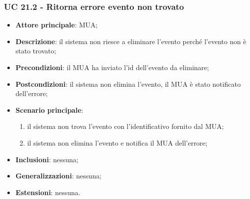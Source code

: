     \subsubsection{UC 21.2 - Ritorna errore evento non trovato} \label{sec:UC21.2}
    \begin{itemize}
        \item \textbf{Attore principale}: MUA;
        \item \textbf{Descrizione}: il sistema non riesce a eliminare l'evento perché l'evento non è stato trovato;
        \item \textbf{Precondizioni}: il MUA ha inviato l'id dell'evento da eliminare;
        \item \textbf{Postcondizioni}: il sistema non elimina l'evento, il MUA è stato notificato dell'errore;
        \item \textbf{Scenario principale}:
            \begin{enumerate}
                \item il sistema non trova l'evento con l'identificativo fornito dal MUA;
                \item il sistema non elimina l'evento e notifica il MUA dell'errore;
            \end{enumerate}
        \item \textbf{Inclusioni}: nessuna;
        \item \textbf{Generalizzazioni}: nessuna;
        \item \textbf{Estensioni}: nessuna.
    \end{itemize}

